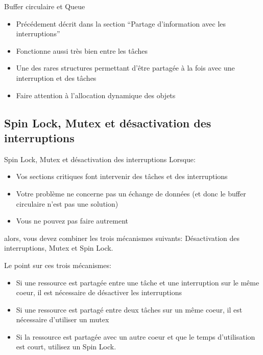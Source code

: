 \begin{frame}[fragile]{Buffer circulaire et Queue}
  \begin{itemize}
  \item  Précédement décrit dans  la section  ``Partage d'information
    avec les interruptions''
  \item Fonctionne aussi très bien entre les tâches
  \item Une  des rares structures  permettant d'être partagée à  la fois
    avec une interruption et des tâches
  \item Faire attention à l'allocation dynamique des objets
  \end{itemize}
\end{frame}

\subsection{Spin Lock, Mutex et désactivation des interruptions}

\begin{frame}[fragile]{Spin Lock, Mutex et désactivation des interruptions}
  Lorsque:
  \begin{itemize}
  \item  Vos  sections critiques  font  intervenir  des  tâches et  des
    interruptions
  \item Votre problème ne concerne  pas un échange de données (et donc
    le buffer circulaire n'est pas une solution)
  \item Vous ne pouvez pas faire autrement
  \end{itemize}
  alors,   vous  devez   combiner  les   trois   mécanismes  suivants:
  Désactivation des interruptions, Mutex et Spin Lock.

  Le point sur ces trois mécanismes:
  \begin{itemize}
  \item  Si  une  ressource  est   partagée  entre  une  tâche  et  une
    interruption sur  le même coeur,  il est nécessaire  de désactiver
    les interruptions
  \item  Si une ressource  est partagé  entre deux  tâches sur  un même
    coeur, il est nécessaire d'utiliser un mutex
  \item Si  la ressource est  partagée avec un  autre coeur et  que le
    temps d'utilisation est court, utilisez un Spin Lock.
  \end{itemize}
\end{frame}

